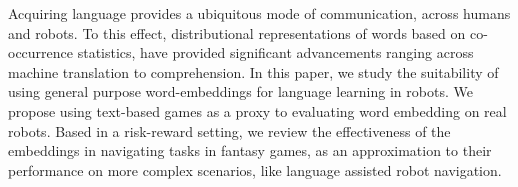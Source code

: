 Acquiring language provides a ubiquitous mode of communication, across humans and robots. To this effect, distributional representations of words based on co-occurrence statistics, have provided significant advancements ranging across machine translation to comprehension. In this paper, we study the suitability of using general purpose word-embeddings for language learning in robots. We propose using text-based games as a proxy to evaluating word embedding on real robots. Based in a risk-reward setting, we review the effectiveness of the embeddings in navigating tasks in fantasy games, as an approximation to their performance on more complex scenarios, like language assisted robot navigation.
